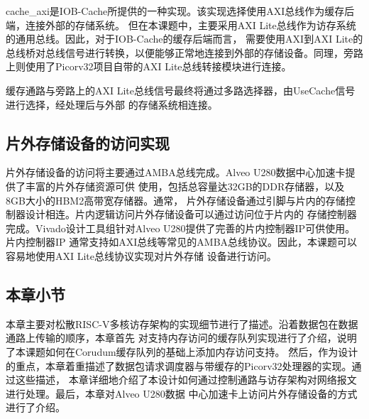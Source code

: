 cache\_axi是IOB-Cache所提供的一种实现。该实现选择使用AXI总线作为缓存后端，连接外部的存储系统。
但在本课题中，主要采用AXI Lite总线作为访存系统的通用总线。因此，对于IOB-Cache的缓存后端而言，
需要使用AXI到AXI Lite的总线桥对总线信号进行转换，以便能够正常地连接到外部的存储设备。同理，旁路
上则使用了Picorv32项目自带的AXI Lite总线转接模块进行连接。

缓存通路与旁路上的AXI Lite总线信号最终将通过多路选择器，由UseCache信号进行选择，经处理后与外部
的存储系统相连接。

\subsection{片外存储设备的访问实现}

片外存储设备的访问将主要通过AMBA总线完成。Alveo U280数据中心加速卡提供了丰富的片外存储资源可供
使用，包括总容量达32GB的DDR存储器，以及8GB大小的HBM2高带宽存储器\cite{alveo2021datasheet}。通常，
片外存储设备通过引脚与片内的存储控制器设计相连。片内逻辑访问片外存储设备可以通过访问位于片内的
存储控制器完成。Vivado设计工具组针对Alveo U280提供了完善的片内控制器IP可供使用。片内控制器IP
通常支持如AXI总线等常见的AMBA总线协议。因此，本课题可以容易地使用AXI Lite总线协议实现对片外存储
设备进行访问。

\subsection{本章小节}

本章主要对松散RISC-V多核访存架构的实现细节进行了描述。沿着数据包在数据通路上传输的顺序，本章首先
对支持内存访问的缓存队列实现进行了介绍，说明了本课题如何在Corudum缓存队列的基础上添加内存访问支持。
然后，作为设计的重点，本章着重描述了数据包请求调度器与带缓存的Picorv32处理器的实现。通过这些描述，
本章详细地介绍了本设计如何通过控制通路与访存架构对网络报文进行处理。最后，本章对Alveo U280数据
中心加速卡上访问片外存储设备的方式进行了介绍。
